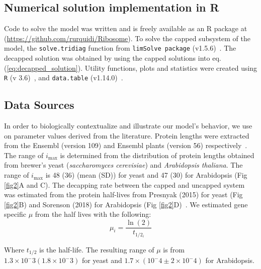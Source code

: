 \documentclass[10pt,letterpaper]{article}
\newcommand{\imax}{\ensuremath{{i_{\max}}}\xspace}
\begin{document}
\subsection*{Numerical solution implementation in R}
Code to solve the model was written and is freely available as an R package at (\url{https://github.com/rurquidi/Ribosome}). To solve the capped subsystem of the model, the \texttt{solve.tridiag} function from \texttt{limSolve package} (v1.5.6)~\cite{RN41}. The decapped solution was obtained by using the capped solutions into eq. (\ref{eq:decapped_solution}). Utility functions, plots and statistics were created using  \texttt{R} (v 3.6)~\cite{RN43}, and  \texttt{data.table} (v1.14.0)~\cite{RN42}. 
		
\subsection*{Data Sources}

In order to biologically contextualize and illustrate our model's behavior, we use on parameter values derived from the literature.
Protein lengths were extracted from the Ensembl (version 109) and Ensembl plants (version 56) respectively~\cite{RN26,RN25,RN24}.  
The range of \imax is determined from the distribution of protein lengths obtained from brewer's yeast (\textit{saccharomyces cerevisiae}) and \textit{Arabidopsis thaliana}. The range of \imax is  48 (36) (mean (SD)) for yeast and 47 (30) for Arabidopsis (Fig \ref{fig2}A and C).
The decapping rate between the capped and uncapped system was estimated from the protein half-lives from Presnyak (2015) for yeast (Fig \ref{fig2}B) and Sorenson (2018) for Arabidopsis (Fig \ref{fig2}D)~\cite{RN27,RN28}.
We estimated gene specific $\mu$ from the half lives with the following:
	\begin{equation*}
		\mu_i = \frac{\ln(2)}{t_{1/2_i}}
	\end{equation*}

Where $t_{1/2}$ is the half-life. The resulting range of $\mu$ is from $1.3 \times 10^-3 (1.8 \times 10^-3)$ for yeast and $1.7 \times (10^-4 \pm 2 \times 10^-4)$ for Arabidopsis. 
\end{document}
